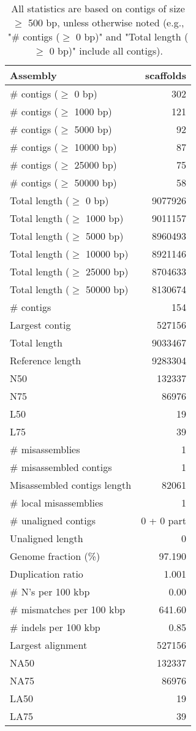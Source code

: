 \documentclass[12pt,a4paper]{article}
\begin{document}
\begin{table}[ht]
\begin{center}
\caption{All statistics are based on contigs of size $\geq$ 500 bp, unless otherwise noted (e.g., "\# contigs ($\geq$ 0 bp)" and "Total length ($\geq$ 0 bp)" include all contigs).}
\begin{tabular}{|l*{1}{|r}|}
\hline
Assembly & scaffolds \\ \hline
\# contigs ($\geq$ 0 bp) & 302 \\ \hline
\# contigs ($\geq$ 1000 bp) & 121 \\ \hline
\# contigs ($\geq$ 5000 bp) & 92 \\ \hline
\# contigs ($\geq$ 10000 bp) & 87 \\ \hline
\# contigs ($\geq$ 25000 bp) & 75 \\ \hline
\# contigs ($\geq$ 50000 bp) & 58 \\ \hline
Total length ($\geq$ 0 bp) & 9077926 \\ \hline
Total length ($\geq$ 1000 bp) & 9011157 \\ \hline
Total length ($\geq$ 5000 bp) & 8960493 \\ \hline
Total length ($\geq$ 10000 bp) & 8921146 \\ \hline
Total length ($\geq$ 25000 bp) & 8704633 \\ \hline
Total length ($\geq$ 50000 bp) & 8130674 \\ \hline
\# contigs & 154 \\ \hline
Largest contig & 527156 \\ \hline
Total length & 9033467 \\ \hline
Reference length & 9283304 \\ \hline
N50 & 132337 \\ \hline
N75 & 86976 \\ \hline
L50 & 19 \\ \hline
L75 & 39 \\ \hline
\# misassemblies & 1 \\ \hline
\# misassembled contigs & 1 \\ \hline
Misassembled contigs length & 82061 \\ \hline
\# local misassemblies & 1 \\ \hline
\# unaligned contigs & 0 + 0 part \\ \hline
Unaligned length & 0 \\ \hline
Genome fraction (\%) & 97.190 \\ \hline
Duplication ratio & 1.001 \\ \hline
\# N's per 100 kbp & 0.00 \\ \hline
\# mismatches per 100 kbp & 641.60 \\ \hline
\# indels per 100 kbp & 0.85 \\ \hline
Largest alignment & 527156 \\ \hline
NA50 & 132337 \\ \hline
NA75 & 86976 \\ \hline
LA50 & 19 \\ \hline
LA75 & 39 \\ \hline
\end{tabular}
\end{center}
\end{table}
\end{document}
